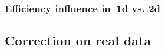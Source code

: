 \documentclass[11pt,a4paper,twoside]{book}
\numberwithin{equation}{chapter}
\begin{document}

\pagebreak

\pagebreak


\subsection{Efficiency influence in 1d vs. 2d}

\section{Correction on real data}






\chapter{}
\pagestyle{fancy}





\listoffigures
\listoftables

\appendix
\end{document}
